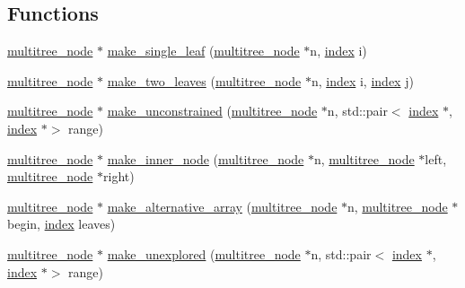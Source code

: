 \subsection*{Functions}
\begin{DoxyCompactItemize}
\item 
\hyperlink{structterraces_1_1multitree__node}{multitree\+\_\+node} $\ast$ \hyperlink{namespaceterraces_1_1multitree__impl_a617319722b1ea24e7a14646ccd6d3927}{make\+\_\+single\+\_\+leaf} (\hyperlink{structterraces_1_1multitree__node}{multitree\+\_\+node} $\ast$n, \hyperlink{namespaceterraces_adbc33ccb543d1634e96d0eb02e472c77}{index} i)
\item 
\hyperlink{structterraces_1_1multitree__node}{multitree\+\_\+node} $\ast$ \hyperlink{namespaceterraces_1_1multitree__impl_ad947b5544d1b10e338831969f59cd917}{make\+\_\+two\+\_\+leaves} (\hyperlink{structterraces_1_1multitree__node}{multitree\+\_\+node} $\ast$n, \hyperlink{namespaceterraces_adbc33ccb543d1634e96d0eb02e472c77}{index} i, \hyperlink{namespaceterraces_adbc33ccb543d1634e96d0eb02e472c77}{index} j)
\item 
\hyperlink{structterraces_1_1multitree__node}{multitree\+\_\+node} $\ast$ \hyperlink{namespaceterraces_1_1multitree__impl_a442f7413aee6e1e97a2c7dfeb1a9c059}{make\+\_\+unconstrained} (\hyperlink{structterraces_1_1multitree__node}{multitree\+\_\+node} $\ast$n, std\+::pair$<$ \hyperlink{namespaceterraces_adbc33ccb543d1634e96d0eb02e472c77}{index} $\ast$, \hyperlink{namespaceterraces_adbc33ccb543d1634e96d0eb02e472c77}{index} $\ast$$>$ range)
\item 
\hyperlink{structterraces_1_1multitree__node}{multitree\+\_\+node} $\ast$ \hyperlink{namespaceterraces_1_1multitree__impl_aea68de8e6794640633d087a3911b38af}{make\+\_\+inner\+\_\+node} (\hyperlink{structterraces_1_1multitree__node}{multitree\+\_\+node} $\ast$n, \hyperlink{structterraces_1_1multitree__node}{multitree\+\_\+node} $\ast$left, \hyperlink{structterraces_1_1multitree__node}{multitree\+\_\+node} $\ast$right)
\item 
\hyperlink{structterraces_1_1multitree__node}{multitree\+\_\+node} $\ast$ \hyperlink{namespaceterraces_1_1multitree__impl_adb494a0d2be0b11b08344ee2a2251eab}{make\+\_\+alternative\+\_\+array} (\hyperlink{structterraces_1_1multitree__node}{multitree\+\_\+node} $\ast$n, \hyperlink{structterraces_1_1multitree__node}{multitree\+\_\+node} $\ast$begin, \hyperlink{namespaceterraces_adbc33ccb543d1634e96d0eb02e472c77}{index} leaves)
\item 
\hyperlink{structterraces_1_1multitree__node}{multitree\+\_\+node} $\ast$ \hyperlink{namespaceterraces_1_1multitree__impl_a97aee75a65e49257b8b21eba0dc090a2}{make\+\_\+unexplored} (\hyperlink{structterraces_1_1multitree__node}{multitree\+\_\+node} $\ast$n, std\+::pair$<$ \hyperlink{namespaceterraces_adbc33ccb543d1634e96d0eb02e472c77}{index} $\ast$, \hyperlink{namespaceterraces_adbc33ccb543d1634e96d0eb02e472c77}{index} $\ast$$>$ range)
\end{DoxyCompactItemize}


